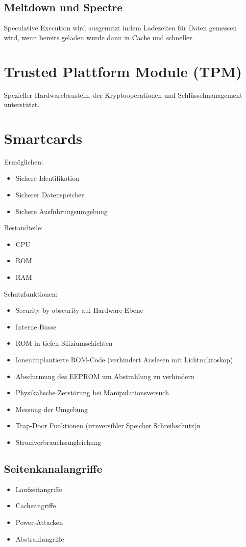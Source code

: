 \subsection{Meltdown und Spectre}
Speculative Execution wird ausgenutzt indem Ladezeiten für Daten gemessen wird, 
wenn bereits geladen wurde dann in Cache und schneller.

\section{Trusted Plattform Module (TPM)}
Spezieller Hardwarebaustein, der Kryptooperationen und Schlüsselmanagement unterstützt.

\section{Smartcards}
Ermöglichen:
\begin{itemize}
    \item Sichere Identifikation
    \item Sicherer Datenspeicher
    \item Sichere Ausführungsumgebung
\end{itemize}

Bestandteile:
\begin{itemize}
    \item CPU
    \item ROM
    \item RAM
\end{itemize}

Schutzfunktionen:
\begin{itemize}
    \item Security by obscurity auf Hardware-Ebene
    \item Interne Busse
    \item ROM in tiefen Siliziumschichten
    \item Ionenimplantierte ROM-Code (verhindert Auslesen mit Lichtmikroskop)
    \item Abschirmung des EEPROM um Abstrahlung zu verhindern
    \item Physikalische Zerstörung bei Manipulationsversuch
    \item Messung der Umgebung
    \item Trap-Door Funktionen (irreversibler Speicher Schreibschutz)n
    \item Stromverbrauchsangleichung
\end{itemize}

\subsection{Seitenkanalangriffe}
\begin{itemize}
    \item Laufzeitangriffe
    \item Cacheangriffe
    \item Power-Attacken
    \item Abstrahlangriffe
\end{itemize}
